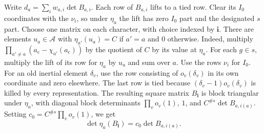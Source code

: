 Write \(d_a=\sum_i w_{a,i}\det B_{a,i}\).
Each row of \(B_{a,i}\) lifts to a tied row. Clear its \(I_0\)
coordinates with the \(\nu_i\), so under \(\eta_a\) the lift has
zero \(I_0\) part and the designated \(s\) part.
Choose one matrix on each character, with choice indexed by \(\mathbf i\).
There are elements \(u_a\in\mathcal A\) with \(\eta_{a'}(u_a)=C\)
if \(a'=a\) and \(0\) otherwise. Indeed, multiply
\(\prod_{a'\ne a}(a_{\mathrm c}-\chi_{a'}(a_{\mathrm c}))\) by the
quotient of \(C\) by its value at \(\eta_a\).
For each \(g\in s\), multiply the lift of its row for \(\eta_a\)
by \(u_a\) and sum over \(a\). Use the rows \(\nu_i\) for \(I_0\).
For an old inertial element \(\delta_v\), use the row consisting
of \(o_v(\delta_v)\) in its own coordinate and zero elsewhere.
The last row is tied because \((\delta_v-1)o_v(\delta_v)\) is
killed by every representation. The resulting square matrix
\(B_{\mathbf i}\) is block triangular under \(\eta_a\), with
diagonal block determinants \(\prod_v o_v(1),\,1\), and
\(C^{\#s}\det B_{a,i(a)}\). Setting \(c_0=C^{\#s}\prod_v o_v(1)\), we get
\[
 \det\eta_a(B_{\mathbf i})=c_0\det B_{a,i(a)}.
\]
